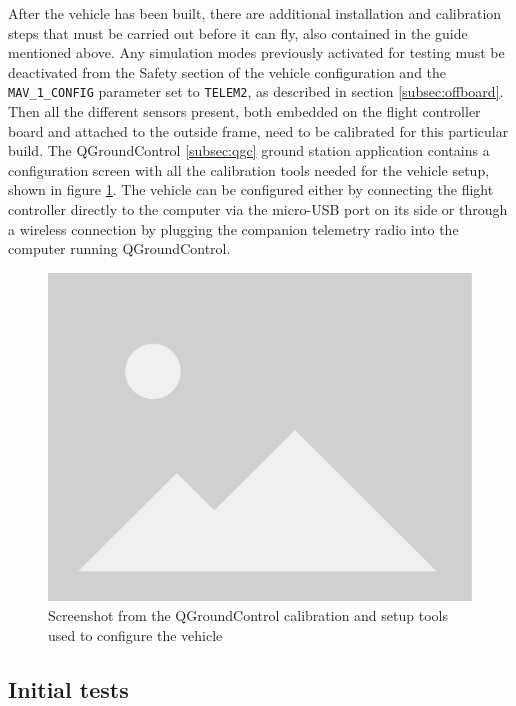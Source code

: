 After the vehicle has been built, there are additional installation and calibration steps that must be carried out before it can fly, also contained in the guide mentioned above.
Any simulation modes previously activated for testing must be deactivated from the Safety section of the vehicle configuration and the \texttt{MAV\_1\_CONFIG} parameter set to \texttt{TELEM2}, as described in section \ref{subsec:offboard}.
Then all the different sensors present, both embedded on the flight controller board and attached to the outside frame, need to be calibrated for this particular build.
The QGroundControl \ref{subsec:qgc} ground station application contains a configuration screen with all the calibration tools needed for the vehicle setup, shown in figure \ref{fig:qgc-config}.
The vehicle can be configured either by connecting the flight controller directly to the computer via the micro-USB port on its side or through a wireless connection by plugging the companion telemetry radio into the computer running QGroundControl.


\begin{figure}
  \centering
  \includegraphics[width=\textwidth, keepaspectratio]{img/placeholder.png}
  \caption{Screenshot from the QGroundControl calibration and setup tools used to configure the vehicle}\label{fig:qgc-config}
\end{figure}


\subsection{Initial tests}
\label{sec:test-8-flight}

